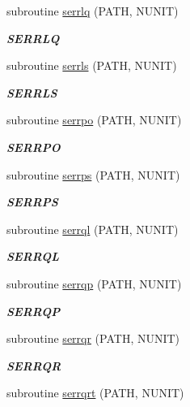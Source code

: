 \begin{DoxyCompactItemize}
subroutine \hyperlink{group__single__lin_gaba734a242dacac9723ca38246ce2b871}{serrlq} (P\+A\+T\+H, N\+U\+N\+I\+T)
\begin{DoxyCompactList}\small\item\em {\bfseries S\+E\+R\+R\+L\+Q} \end{DoxyCompactList}\item 
subroutine \hyperlink{group__single__lin_ga25a9ea27ec699bf56e711800f7ca974a}{serrls} (P\+A\+T\+H, N\+U\+N\+I\+T)
\begin{DoxyCompactList}\small\item\em {\bfseries S\+E\+R\+R\+L\+S} \end{DoxyCompactList}\item 
subroutine \hyperlink{group__single__lin_ga0aabd070de73f57629e42c77ddbddd4c}{serrpo} (P\+A\+T\+H, N\+U\+N\+I\+T)
\begin{DoxyCompactList}\small\item\em {\bfseries S\+E\+R\+R\+P\+O} \end{DoxyCompactList}\item 
subroutine \hyperlink{group__single__lin_gaf01145c0632f26b31aa474a8fcf9dc58}{serrps} (P\+A\+T\+H, N\+U\+N\+I\+T)
\begin{DoxyCompactList}\small\item\em {\bfseries S\+E\+R\+R\+P\+S} \end{DoxyCompactList}\item 
subroutine \hyperlink{group__single__lin_ga23dc8f8edb586d9cc6a97a83f3bbc843}{serrql} (P\+A\+T\+H, N\+U\+N\+I\+T)
\begin{DoxyCompactList}\small\item\em {\bfseries S\+E\+R\+R\+Q\+L} \end{DoxyCompactList}\item 
subroutine \hyperlink{group__single__lin_gad185ab41115f1f2c058e5bd0d7f8885e}{serrqp} (P\+A\+T\+H, N\+U\+N\+I\+T)
\begin{DoxyCompactList}\small\item\em {\bfseries S\+E\+R\+R\+Q\+P} \end{DoxyCompactList}\item 
subroutine \hyperlink{group__single__lin_ga3e2bfafc3cda21864d6dadf379455f26}{serrqr} (P\+A\+T\+H, N\+U\+N\+I\+T)
\begin{DoxyCompactList}\small\item\em {\bfseries S\+E\+R\+R\+Q\+R} \end{DoxyCompactList}\item 
subroutine \hyperlink{group__single__lin_ga6070fa33065c4df594e340d9dac2a601}{serrqrt} (P\+A\+T\+H, N\+U\+N\+I\+T)

\end{DoxyCompactItemize}
